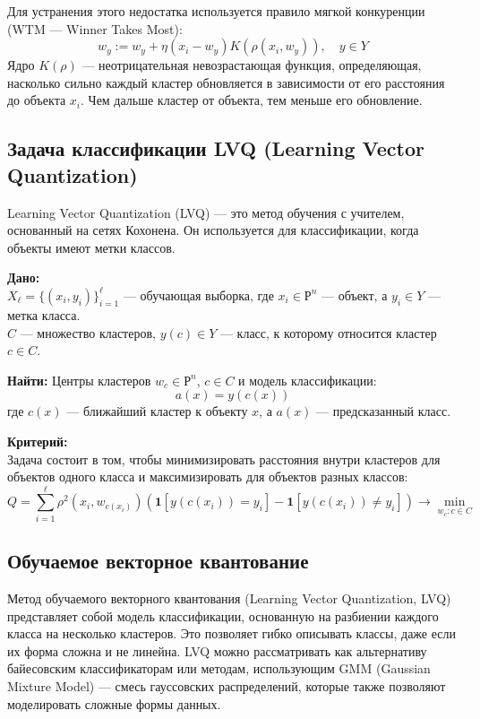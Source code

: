 Для устранения этого недостатка используется правило мягкой конкуренции (WTM — Winner Takes Most):
\[
    w_y := w_y + \eta(x_i - w_y) K(\rho(x_i, w_y)), \quad y \in Y
\]
Ядро $K(\rho)$ — неотрицательная невозрастающая функция, определяющая, насколько сильно каждый кластер обновляется в зависимости от его расстояния до объекта $x_i$. Чем дальше кластер от объекта, тем меньше его обновление.

\subsection{Задача классификации LVQ (Learning Vector Quantization)}
Learning Vector Quantization (LVQ) — это метод обучения с учителем, основанный на сетях Кохонена. Он используется для классификации, когда объекты имеют метки классов.

\textbf{Дано:}\\  
$X_\ell = \{ (x_i, y_i) \}_{i=1}^{\ell}$ — обучающая выборка, где $x_i \in \mathbb{Р}^n$ — объект, а $y_i \in Y$ — метка класса.\\
$C$ — множество кластеров, $y(c) \in Y$ — класс, к которому относится кластер $c \in C$.

\textbf{Найти:}
Центры кластеров $w_c \in \mathbb{Р}^n$, $c \in C$ и модель классификации:
\[
    a(x) = y(c(x))
\]
где $c(x)$ — ближайший кластер к объекту $x$, а $a(x)$ — предсказанный класс.

\textbf{Критерий:} \\
Задача состоит в том, чтобы минимизировать расстояния внутри кластеров для объектов одного класса и максимизировать для объектов разных классов:
\[
    Q = \sum_{i=1}^{\ell} \rho^2(x_i, w_{c(x_i)}) \left( \mathbf{1}[y(c(x_i)) = y_i] - \mathbf{1}[y(c(x_i)) \neq y_i] \right) \to \min_{w_c : c \in C}
\]

\subsection{Обучаемое векторное квантование}
Метод обучаемого векторного квантования (Learning Vector Quantization, LVQ) представляет собой модель классификации, основанную на разбиении каждого класса на несколько кластеров. Это позволяет гибко описывать классы, даже если их форма сложна и не линейна. LVQ можно рассматривать как альтернативу байесовским классификаторам или методам, использующим GMM (Gaussian Mixture Model) — смесь гауссовских распределений, которые также позволяют моделировать сложные формы данных.

